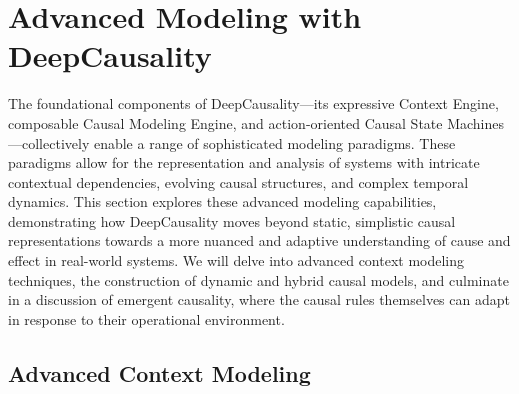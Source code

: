 \section{Advanced Modeling with DeepCausality}
\label{sec:advanced_modeling}

The foundational components of DeepCausality—its expressive Context Engine, composable Causal Modeling Engine, and action-oriented Causal State Machines—collectively enable a range of sophisticated modeling paradigms. These paradigms allow for the representation and analysis of systems with intricate contextual dependencies, evolving causal structures, and complex temporal dynamics. This section explores these advanced modeling capabilities, demonstrating how DeepCausality moves beyond static, simplistic causal representations towards a more nuanced and adaptive understanding of cause and effect in real-world systems. We will delve into advanced context modeling techniques, the construction of dynamic and hybrid causal models, and culminate in a discussion of emergent causality, where the causal rules themselves can adapt in response to their operational environment.

\subsection{Advanced Context Modeling}
\label{sucsec:context_modeling}

